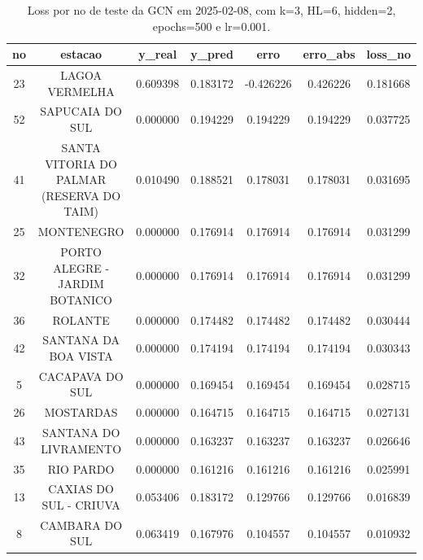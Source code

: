 \begin{table}[h]
\centering
\caption{Loss por no de teste da GCN em 2025-02-08, com k=3, HL=6, hidden=2, epochs=500 e lr=0.001.}
\label{tab:gcn_loss_k3_hl6_h2_e500_d20250208}
\begin{tabular}{ccccccc}
\toprule
no & estacao & y\_real & y\_pred & erro & erro\_abs & loss\_no \\
\midrule
23 & LAGOA VERMELHA & 0.609398 & 0.183172 & -0.426226 & 0.426226 & 0.181668 \\
52 & SAPUCAIA DO SUL & 0.000000 & 0.194229 & 0.194229 & 0.194229 & 0.037725 \\
41 & SANTA VITORIA DO PALMAR (RESERVA DO TAIM) & 0.010490 & 0.188521 & 0.178031 & 0.178031 & 0.031695 \\
25 & MONTENEGRO & 0.000000 & 0.176914 & 0.176914 & 0.176914 & 0.031299 \\
32 & PORTO ALEGRE - JARDIM BOTANICO & 0.000000 & 0.176914 & 0.176914 & 0.176914 & 0.031299 \\
36 & ROLANTE & 0.000000 & 0.174482 & 0.174482 & 0.174482 & 0.030444 \\
42 & SANTANA DA BOA VISTA & 0.000000 & 0.174194 & 0.174194 & 0.174194 & 0.030343 \\
5 & CACAPAVA DO SUL & 0.000000 & 0.169454 & 0.169454 & 0.169454 & 0.028715 \\
26 & MOSTARDAS & 0.000000 & 0.164715 & 0.164715 & 0.164715 & 0.027131 \\
43 & SANTANA DO LIVRAMENTO & 0.000000 & 0.163237 & 0.163237 & 0.163237 & 0.026646 \\
35 & RIO PARDO & 0.000000 & 0.161216 & 0.161216 & 0.161216 & 0.025991 \\
13 & CAXIAS DO SUL - CRIUVA & 0.053406 & 0.183172 & 0.129766 & 0.129766 & 0.016839 \\
8 & CAMBARA DO SUL & 0.063419 & 0.167976 & 0.104557 & 0.104557 & 0.010932 \\
\bottomrule
\end{tabular}
\end{table}
